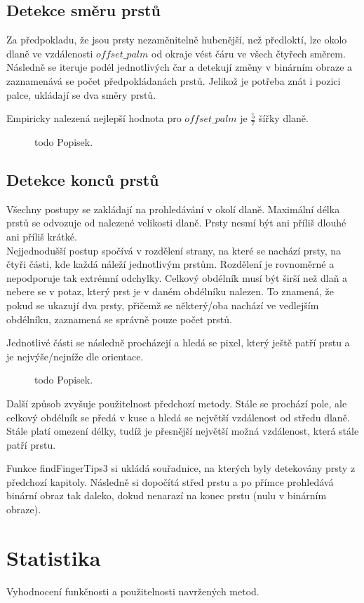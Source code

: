 \subsection{Detekce směru prstů}
Za předpokladu, že jsou prsty nezaměnitelně hubenější, než předloktí, lze okolo dlaně ve vzdálenosti $ offset\_palm $ od okraje vést čáru ve všech čtyřech směrem. Následně se iteruje podél jednotlivých čar a detekují změny v binárním obraze a zaznamenává se počet předpokládanách prstů. Jelikož je potřeba znát i pozici palce, ukládají se dva směry prstů.

Empiricky nalezená nejlepší hodnota pro $ offset\_palm $ je $ \frac{5}{7} $ šířky dlaně. 

\begin{figure}[htp]
\centering
{}
\caption{todo Popisek.}
\label{fig:whereFingers}
\end{figure}

\subsection{Detekce konců prstů}
Všechny postupy se zakládají na prohledávání v okolí dlaně. Maximální délka prstů se odvozuje od nalezené velikosti dlaně. Prsty nesmí být ani příliš dlouhé ani příliš krátké.\\

Nejjednodušší postup spočívá v rozdělení strany, na které se nachází prsty, na čtyři části, kde každá náleží jednotlivým prstům. Rozdělení je rovnoměrné a nepodporuje tak extrémní odchylky. Celkový obdélník musí být širší než dlaň a nebere se v potaz, který prst je v daném obdélníku nalezen. To znamená, že pokud se ukazují dva prsty, přičemž se některý/oba nachází ve vedlejším obdélníku, zaznamená se správně pouze počet prstů.

Jednotlivé části se následně procházejí a hledá se pixel, který ještě patří prstu a je nejvýše/nejníže dle orientace.\\

\begin{figure}[htp]
\centering
{}
\caption{todo Popisek.}
\label{fig:findFingerTips}
\end{figure}

Další způsob zvyšuje použitelnost předchozí metody. Stále se prochází pole, ale celkový obdélník se předá v kuse a hledá se největší vzdálenost od středu dlaně. Stále platí omezení délky, tudíž je přesnější největší možná vzdálenost, která stále patří prstu.

Funkce findFingerTips3 si ukládá souřadnice, na kterých byly detekovány prsty z předchozí kapitoly. Následně si dopočítá střed prstu a po přímce prohledává binární obraz tak daleko, dokud nenarazí na konec prstu (nulu v binárním obraze). 

\section{Statistika}
Vyhodnocení funkčnosti a použitelnosti navržených metod.

\endinput
